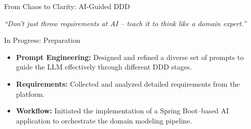 \documentclass[aspectratio=169,12pt]{beamer}
\begin{document}
\begin{frame}{From Chaos to Clarity: AI-Guided DDD}
    \begin{center}
    \end{center}
    \vspace{0.5cm}
    \textit{``Don't just throw requirements at AI – teach it to think like a domain expert.''}
    \end{frame}

\begin{frame}{In Progress: Preparation}
    \begin{itemize}
        \item \textbf{Prompt Engineering:} Designed and refined a diverse set of prompts to guide the LLM effectively through different DDD stages.
        \item \textbf{Requirements:} Collected and analyzed detailed requirements from the platform.
        \item \textbf{Workflow:} Initiated the implementation of a Spring Boot–based AI application to orchestrate the domain modeling pipeline.
    \end{itemize}
\end{frame}
\end{document}
